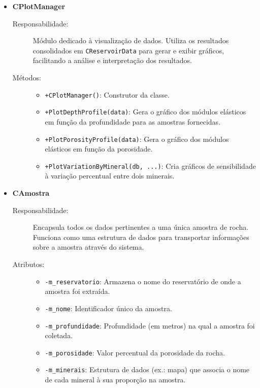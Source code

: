 \begin{itemize}
    \item \textbf{CPlotManager}
    \begin{description}
        \item[Responsabilidade:] Módulo dedicado à visualização de dados. Utiliza os resultados consolidados em \texttt{CReservoirData} para gerar e exibir gráficos, facilitando a análise e interpretação dos resultados.
        
        \item[Métodos:]
        \begin{itemize}
            \item \texttt{+CPlotManager()}: Construtor da classe.
            \item \texttt{+PlotDepthProfile(data)}: Gera o gráfico dos módulos elásticos em função da profundidade para as amostras fornecidas.
            \item \texttt{+PlotPorosityProfile(data)}: Gera o gráfico dos módulos elásticos em função da porosidade.
            \item \texttt{+PlotVariationByMineral(db, ...)}: Cria gráficos de sensibilidade à variação percentual entre dois minerais.
        \end{itemize}
    \end{description}

\item \textbf{CAmostra}
    \begin{description}
        \item[Responsabilidade:] Encapsula todos os dados pertinentes a uma única amostra de rocha. Funciona como uma estrutura de dados para transportar informações sobre a amostra através do sistema.
        
        \item[Atributos:] 
        \begin{itemize}
            \item \texttt{-m\_reservatorio}: Armazena o nome do reservatório de onde a amostra foi extraída.
            \item \texttt{-m\_nome}: Identificador único da amostra.
            \item \texttt{-m\_profundidade}: Profundidade (em metros) na qual a amostra foi coletada.
            \item \texttt{-m\_porosidade}: Valor percentual da porosidade da rocha.
            \item \texttt{-m\_minerais}: Estrutura de dados (ex.: mapa) que associa o nome de cada mineral à sua proporção na amostra.
        \end{itemize}
        

\end{description}
\end{itemize}
